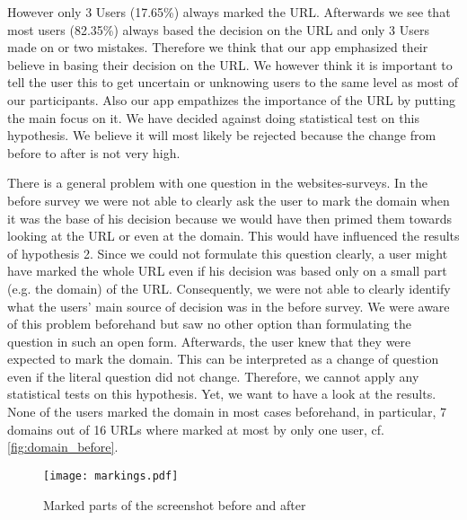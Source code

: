 \begin{description}[leftmargin=0cm]
However only 3 Users (17.65\%) always marked the URL.
Afterwards we see that most users (82.35\%) always based the decision on the URL and only 3 Users made on or two mistakes.
Therefore we think that our app emphasized their believe in basing their decision on the URL.
We however think it is important to tell the user this to get uncertain or unknowing users to the same level as most of our participants.
Also our app empathizes the importance of the URL by putting the main focus on it.
We have decided against doing statistical test on this hypothesis.
We believe it will most likely be rejected because the change from before to after is not very high.
\item[Hypothesis 3:]
There is a general problem with one question in the websites-surveys.
In the before survey we were not able to clearly ask the user to mark the domain when it was the base of his decision because we would have then primed them towards looking at the URL or even at the domain.
This would have influenced the results of hypothesis 2.
Since we could not formulate this question clearly, a user might have marked the whole URL even if his decision was based only on a small part (e.g. the domain) of the URL.
Consequently, we were not able to clearly identify what the users' main source of decision was in the before survey.
We were aware of this problem beforehand but saw no other option than formulating the question in such an open form.
Afterwards, the user knew that they were expected to mark the domain.
This can be interpreted as a change of question even if the literal question did not change.
Therefore, we cannot apply any statistical tests on this hypothesis.
Yet, we want to have a look at the results.
None of the users marked the domain in most cases beforehand, in particular, 7 domains out of 16 URLs where marked at most by only one user, cf. \autoref{fig:domain_before}.
\begin{figure}
\centering
\texttt{[image: markings.pdf]}
\caption{Marked parts of the screenshot before and after}
\label{fig:markings}
\end{figure}


\end{description}

